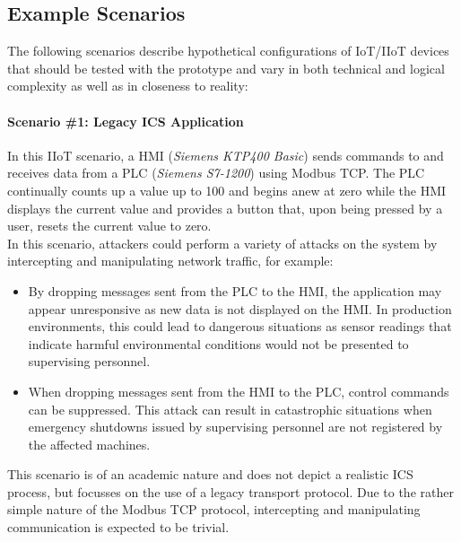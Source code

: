 \subsection{Example Scenarios}
\label{sec:example-scenarios}
The following scenarios describe hypothetical configurations of \ac{IoT}/\ac{IIoT} devices that should be tested with the prototype and vary in both technical and logical complexity as well as in closeness to reality:

\paragraph{Scenario \#1: Legacy \ac{ICS} Application}
\label{par:scenario-1}
In this \ac{IIoT} scenario, a \ac{HMI} (\emph{Siemens KTP400 Basic}) sends commands to and receives data from a \ac{PLC} (\emph{Siemens S7-1200}) using Modbus \ac{TCP}. The \ac{PLC} continually counts up a value up to 100 and begins anew at zero while the \ac{HMI} displays the current value and provides a button that, upon being pressed by a user, resets the current value to zero. \\
In this scenario, attackers could perform a variety of attacks on the system by intercepting and manipulating network traffic, for example:
\begin{itemize}
    \item By dropping messages sent from the \ac{PLC} to the \ac{HMI}, the application may appear unresponsive as new data is not displayed on the \ac{HMI}. In production environments, this could lead to dangerous situations as sensor readings that indicate harmful environmental conditions would not be presented to supervising personnel.
    \item When dropping messages sent from the \ac{HMI} to the \ac{PLC}, control commands can be suppressed. This attack can result in catastrophic situations when emergency shutdowns issued by supervising personnel are not registered by the affected machines.
\end{itemize}
This scenario is of an academic nature and does not depict a realistic \ac{ICS} process, but focusses on the use of a legacy transport protocol. Due to the rather simple nature of the Modbus \ac{TCP} protocol, intercepting and manipulating communication is expected to be trivial. %

